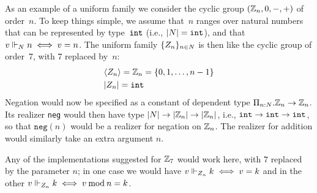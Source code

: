 \iflong
As an example of a uniform family we consider the cyclic group
$(\mathbb{Z}_n, 0, {-}, {+})$ of order~$n$. To keep things simple, we assume
that~$n$ ranges over natural numbers that can be represented by
type~$\mathtt{int}$ (i.e., $|N|=\mathtt{int}$), and that 
$v \Vdash_N n \iff v = n$.
%
The uniform family $\{Z_n\}_{n \in N}$ is then like the cyclic group of order~$7$, with $7$ replaced by~$n$:
%
\begin{align*}
  & \langle Z_n \rangle = \mathbb{Z}_n = \{0, 1, \ldots, n - 1\}
  \\
  & |Z_n| = \mathtt{int}
\end{align*}
%
Negation would now be specified as a constant of dependent type
$\Pi_{n{:}N}. \mathbb{Z}_n\to\mathbb{Z}_n$.  Its realizer \texttt{neg}
would then have type $|N|\to|\mathbb{Z}_n|\to{|\mathbb{Z}_n|}$,
i.e., $\mathtt{int}\to\mathtt{int}\to\mathtt{int}$, so that $\mathtt{neg}(n)$ would
be a realizer for negation on $\mathbb{Z}_n$.   The realizer for addition would
similarly take an extra argument $n$.  

Any of the implementations suggested for $\mathbb{Z}_7$ would work here, with
$7$ replaced by the parameter $n$; in one case we would have
$v \Vdash_{Z_n} k \iff v = k$ and in the other
$v \Vdash_{Z_n} k \iff v \mathbin{\mathrm{mod}} n = k$.
\fi %


